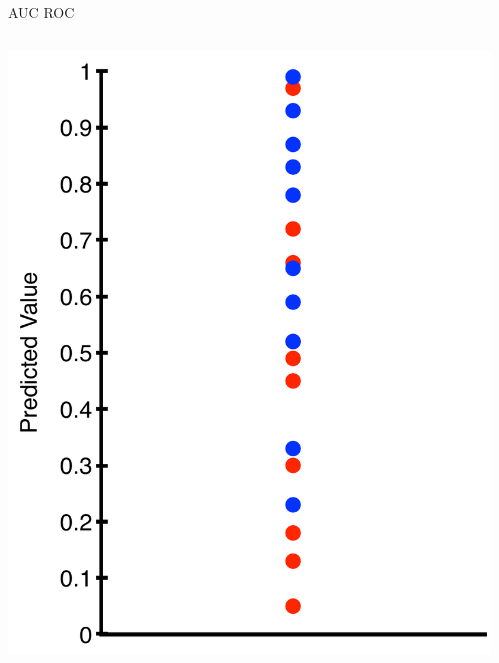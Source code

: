 \documentclass[aspectratio=169]{beamer}
\begin{document}
\begin{frame}{AUC ROC}

\begin{columns}
\begin{column}{0.2\textwidth}
    \includegraphics[width=1\textwidth]{lectSup/AUCEx1.pdf} 
\end{column}
\begin{column}{0.2\textwidth}

\end{column}
\end{columns}
\end{frame}
\end{document}
